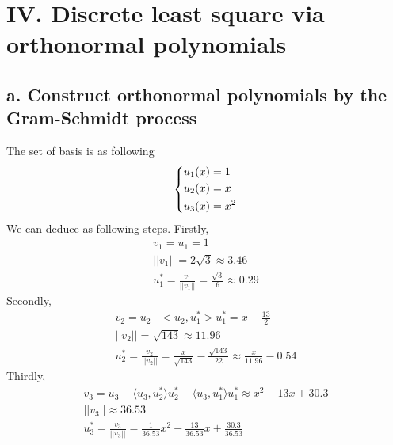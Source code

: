 \documentclass[twoside,a4paper]{article}
\begin{document}
\section*{IV. Discrete least square via orthonormal polynomials}
\subsection*{a. Construct orthonormal polynomials by the Gram-Schmidt process}
The set of basis is as following 
\[ \left \{ \begin{lgathered}
u_1(x)=1 \\
u_2(x)=x \\
u_3(x)=x^2
\end{lgathered} \right. \]
We can deduce as following steps. Firstly, 
\begin{gather}
v_1=u_1=1\\
||v_1||= 2\sqrt{3} \approx 3.46\\
u_1^*=\frac{v_1}{||v_1||}=\frac{\sqrt{3}}{6} \approx 0.29
\end{gather}
Secondly,
\begin{gather}
v_2=u_2-<u_2,u_1^*>u_1^*=x-\frac{13}{2}\\
||v_2||=\sqrt{143} \approx 11.96 \\
u_2^*=\frac{v_2}{||v_2||}=\frac{x}{\sqrt{143}}-\frac{\sqrt{143}}{22} \approx \frac{x}{11.96}-0.54
\end{gather}
Thirdly,
\begin{gather}
v_3=u_3-\langle u_3,u_2^* \rangle u_2^*-\langle u_3,u_1^* \rangle u_1^* \approx x^2-13x+30.3\\
||v_3|| \approx  36.53\\
u_3^*=\frac{v_3}{||v_3||}=\frac{1}{36.53}x^2-\frac{13}{36.53}x+\frac{30.3}{36.53}
\end{gather}
\end{document}
